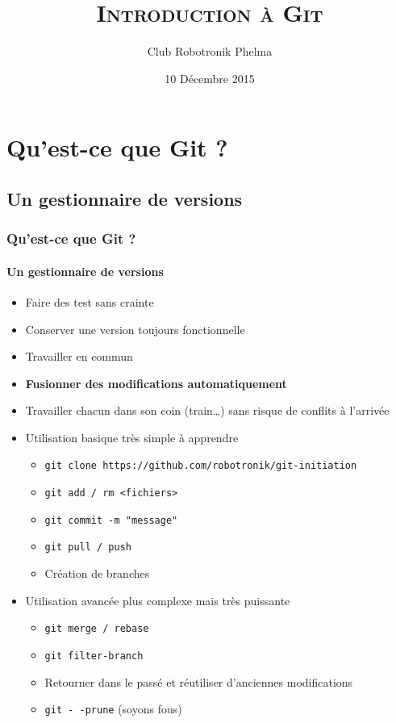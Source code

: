 \documentclass[9pt,a9paper,handout]{beamer}
\title{\textsc{Introduction à Git}}
\author{Club Robotronik Phelma}
\date{10 Décembre 2015}
\begin{document}
\begin{frame} \titlepage       \end{frame}
\begin{frame} \tableofcontents \end{frame}

\section{Qu'est-ce que Git ?}
\subsection{Un gestionnaire de versions}
\begin{frame}
\frametitle{Qu'est-ce que Git ?}
\framesubtitle{Un gestionnaire de versions}
\begin{itemize}
    \item Faire des test sans crainte
    \item Conserver une version toujours fonctionnelle
    \item Travailler en commun
    \item \textbf{Fusionner des modifications automatiquement}
    \item Travailler chacun dans son coin (train…) sans risque de conflits à l'arrivée
\end{itemize}
\end{frame}

\begin{frame}
\begin{itemize}
    \item Utilisation basique très simple à apprendre
    \begin{itemize}
        \item \texttt{git clone https://github.com/robotronik/git-initiation}
        \item \texttt{git add / rm <fichiers>}
        \item \texttt{git commit -m "message"}
        \item \texttt{git pull / push}
        \item Création de branches
    \end{itemize}
    \item Utilisation avancée plus complexe mais très puissante
    \begin{itemize}
        \item \texttt{git merge / rebase}
        \item \texttt{git filter-branch}
        \item Retourner dans le passé et réutiliser d'anciennes modifications
        \item \texttt{git -\,-prune} (soyons fous)
    \end{itemize}
\end{itemize}
\end{frame}
\end{document}
